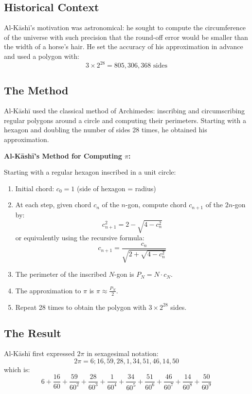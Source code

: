 \documentclass[11pt,a4paper]{article}
\newenvironment{mathalgo}{%
  \par\vspace{0.3cm}
  \begin{framed}
  \setlength{\parindent}{0pt}
}{%
  \end{framed}
  \par\vspace{0.3cm}
}
\begin{document}
\subsection{Historical Context}

Al-K\=ash\=i's motivation was astronomical: he sought to compute the
circumference of the universe with such precision that the round-off
error would be smaller than the width of a horse's hair. He set the
accuracy of his approximation in advance and used a polygon with:
\[
3 \times 2^{28} = 805{,}306{,}368 \text{ sides}
\]

\subsection{The Method}

Al-K\=ash\=i used the classical method of Archimedes: inscribing and
circumscribing regular polygons around a circle and computing their
perimeters. Starting with a hexagon and doubling the number of sides
28 times, he obtained his approximation.

\begin{mathalgo}
\textbf{Al-K\=ash\=i's Method for Computing $\pi$:}

Starting with a regular hexagon inscribed in a unit circle:
\begin{enumerate}[nosep]
  \item Initial chord: $c_0 = 1$ (side of hexagon = radius)
  \item At each step, given chord $c_n$ of the $n$-gon, compute chord
  $c_{n+1}$ of the $2n$-gon by:
    \[
    c_{n+1}^2 = 2 - \sqrt{4 - c_n^2}
    \]
  or equivalently using the recursive formula:
    \[
    c_{n+1} = \frac{c_n}{\sqrt{2 + \sqrt{4 - c_n^2}}}
    \]
  \item The perimeter of the inscribed $N$-gon is $P_N = N \cdot
  c_N$.
  \item The approximation to $\pi$ is $\pi \approx \frac{P_N}{2}$.
  \item Repeat 28 times to obtain the polygon with $3 \times 2^{28}$
  sides.
\end{enumerate}
\end{mathalgo}

\subsection{The Result}

Al-K\=ash\=i first expressed $2\pi$ in sexagesimal notation:
\[
2\pi = 6; 16, 59, 28, 1, 34, 51, 46, 14, 50
\]
which is:
\[
6 + \frac{16}{60} + \frac{59}{60^2} + \frac{28}{60^3} + \frac{1}{60^4} +
\frac{34}{60^5} + \frac{51}{60^6} + \frac{46}{60^7} + \frac{14}{60^8} +
\frac{50}{60^9}
\]
\end{document}
